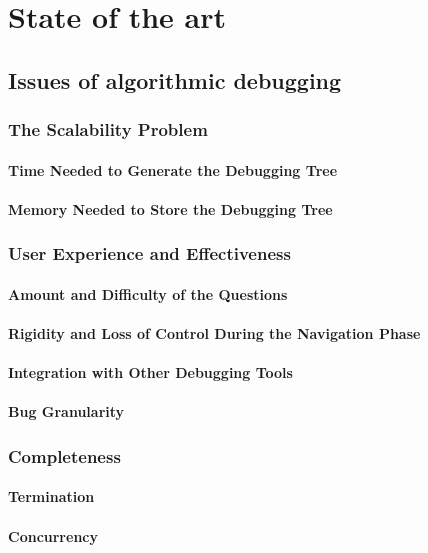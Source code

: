 \chapter{State of the art}
\label{cap:estadoDeLaCuestion}

\section{Issues of algorithmic debugging}
\subsection{The Scalability Problem}
\subsubsection{Time Needed to Generate the Debugging Tree}
\subsubsection{Memory Needed to Store the Debugging Tree}
\subsection{User Experience and Effectiveness}
\subsubsection{Amount and Difficulty of the Questions}
\subsubsection{Rigidity and Loss of Control During the Navigation Phase}
\subsubsection{Integration with Other Debugging Tools}
\subsubsection{Bug Granularity}
\subsection{Completeness}
\subsubsection{Termination}
\subsubsection{Concurrency}
